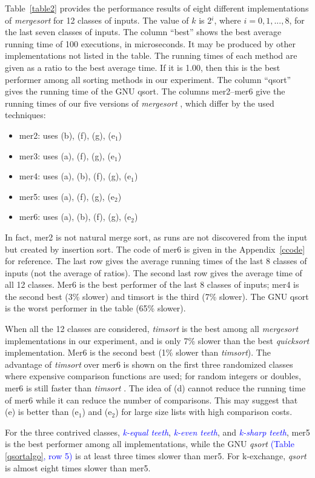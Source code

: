 \documentclass[AMA,STIX1COL]{WileyNJD-v2}
\newcommand{\keq}{\textcolor{blue}{\emph{k-equal teeth}}}
\newcommand{\kev}{\textcolor{blue}{\emph{k-even teeth}}}
\newcommand{\ksha}{\textcolor{blue}{\emph{k-sharp teeth}}}
\newcommand{\qusort}{\emph{quicksort }}
\newcommand{\qsort}{\emph{qsort }}
\newcommand{\tsort}{\emph{timsort }}
\newcommand{\tsortn}{\emph{timsort}}
\newcommand{\msort}{\emph{mergesort }}
\begin{document}
Table~\ref{table2} provides the performance results of eight different implementations of \msort for 12 classes of inputs. The value of $k$ is 2$^i$, where $i = 0, 1, ..., 8$, for the last seven classes of inputs. The column “best” shows the best average running time of 100 executions, in microseconds. It may be produced by other implementations not listed in the table. The running times of each method are given as a ratio to the best average time. If it is 1.00, then this is the best performer among all sorting methods in our experiment. The column “qsort” gives the running time of the GNU qsort. The columns mer2–mer6 give the running times of our five versions of \msort, which differ by the used techniques:
\begin{itemize}
\item mer2: uses (b), (f), (g), (e$_1$)
\item mer3: uses (a), (f), (g), (e$_1$)
\item mer4: uses (a), (b), (f), (g), (e$_1$)
\item mer5: uses (a), (f), (g), (e$_2$)
\item mer6: uses (a), (b), (f), (g), (e$_2$)
\end{itemize}

In fact, mer2 is not natural merge sort, as runs are not discovered from the input but created by insertion sort. 
The code of mer6 is given in the Appendix~\ref{ccode} for reference.  
The last row gives the average running times of the last 8 classes of inputs (not the average of ratios). 
The second last row gives the average time of all 12 classes. 
Mer6 is the best performer of the last 8 classes of inputs; mer4 is the second best (3\% slower) and timsort is the third (7\% slower). 
The GNU qsort is the worst performer in the table (65\% slower).

When all the 12 classes are considered, \tsort is the best among all \msort implementations in our experiment, and is only 7\% slower than the best \qusort implementation. Mer6 is the second best (1\% slower than \tsortn). 
The advantage of \tsort over mer6 is shown on the first three randomized classes where expensive comparison functions are used; for random integers or doubles, mer6 is still faster than \tsort. 
The idea of (d) cannot reduce the running time of mer6 while it can reduce the number of comparisons. 
This may suggest that (e) is better than (e$_1$) and (e$_2$) for large size lists with high comparison costs. 

For the three contrived classes, \keq, \kev, and \ksha, mer5 is the best performer among all implementations, while the GNU \qsort\textcolor{blue}{(Table \ref{qsortalgo}, row 5)} is at least three times slower than mer5. 
For k-exchange, \qsort is almost eight times slower than mer5.  
\end{document}
